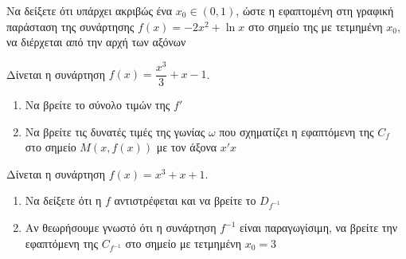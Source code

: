 \documentclass{presentation}
\begin{document}
\begin{askisi}
  Να δείξετε ότι υπάρχει ακριβώς ένα $x_0\in (0,1)$, ώστε η εφαπτομένη στη γραφική παράσταση της συνάρτησης $f(x)=-2x^2+\ln x$ στο σημείο της με τετμημένη $x_0$, να διέρχεται από την αρχή των αξόνων

\end{askisi}

\begin{askisi}
  Δίνεται η συνάρτηση $f(x)=\dfrac{x^3}{3}+x-1$.
  \begin{enumerate}
    \item<1-> Να βρείτε το σύνολο τιμών της $f'$
    \item<2-> Να βρείτε τις δυνατές τιμές της γωνίας $ω$ που σχηματίζει η εφαπτόμενη της $C_f$ στο σημείο $Μ(x,f(x))$ με τον άξονα $x'x$
  \end{enumerate}

\end{askisi}

\begin{askisi}
  Δίνεται η συνάρτηση $f(x)=x^3+x+1$.
  \begin{enumerate}
    \item<1-> Να δείξετε ότι η $f$ αντιστρέφεται και να βρείτε το $D_{f^{-1}}$
    \item<2-> Αν θεωρήσουμε γνωστό ότι η συνάρτηση $f^{-1}$ είναι παραγωγίσιμη, να βρείτε την εφαπτόμενη της $C_{f^{-1}}$ στο σημείο με τετμημένη $x_0=3$
  \end{enumerate}


\end{askisi}
\end{document}
